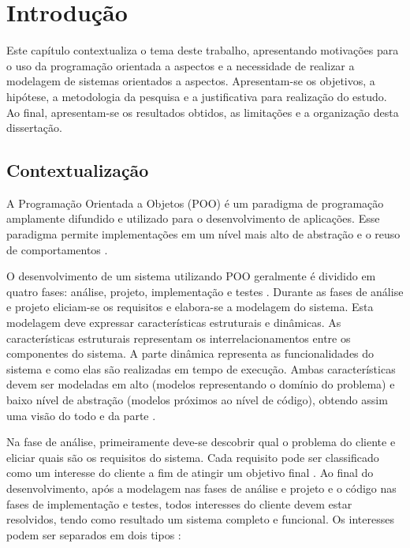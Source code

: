 \chapter{Introdução}

Este capítulo contextualiza o tema deste trabalho, apresentando motivações para o uso da programação orientada a aspectos e a necessidade de realizar
a modelagem de sistemas orientados a aspectos. Apresentam-se os objetivos, a hipótese, a metodologia da pesquisa e a justificativa para realização do
estudo. Ao final, apresentam-se os resultados obtidos, as limitações e a organização desta dissertação.

\section{Contextualização}

A Programação Orientada a Objetos (POO)  é um paradigma de programação amplamente difundido e utilizado
para o desenvolvimento de aplicações. Esse paradigma permite implementações em um nível mais alto de abstração e o reuso de comportamentos
\cite{Laddad:2003:AAP:993468}.

O desenvolvimento de um sistema utilizando POO geralmente é dividido em quatro fases: análise, projeto, implementação e testes
\cite{pressman:01}. Durante as fases de análise e projeto eliciam-se os requisitos e elabora-se a modelagem do sistema. Esta modelagem deve expressar 
características estruturais e dinâmicas. As características estruturais representam os interrelacionamentos entre os componentes do sistema. A parte
dinâmica representa as funcionalidades do sistema e como elas são realizadas em tempo de execução. Ambas características devem ser modeladas em alto 
(modelos representando o domínio do problema) e baixo nível de abstração (modelos próximos ao nível de código), obtendo assim uma visão do todo e da
parte \cite{silva:00}.

Na fase de análise, primeiramente deve-se descobrir qual o problema do cliente e eliciar quais são os requisitos do sistema. Cada requisito
pode ser classificado como um interesse do cliente a fim de atingir um objetivo final \cite{Laddad:2003:AAP:993468}. Ao final do desenvolvimento,
após a modelagem nas fases de análise e projeto e o código nas fases de implementação e testes, todos interesses do cliente devem estar resolvidos, tendo
como resultado um sistema completo e funcional. Os interesses podem ser separados em dois tipos \cite{Laddad:2003:AAP:993468}:

